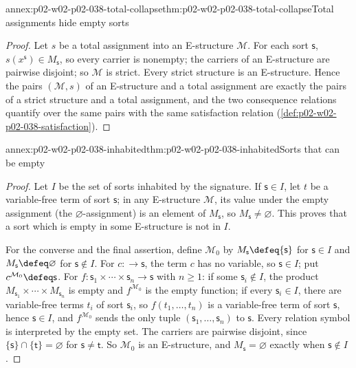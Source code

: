 \begin{annexitem}{annex:p02-w02-p02-038-total-collapse}{thm:p02-w02-p02-038-total-collapse}{Total assignments hide empty sorts}
\begin{proof}
Let \(s\) be a total assignment into an E-structure \(\mathcal M\).  For each
sort \(\mathsf s\), \(s(x^{\mathsf s})\in M_{\mathsf s}\), so every carrier is
nonempty; the carriers of an E-structure are pairwise disjoint; so
\(\mathcal M\) is strict.  Every strict structure is an E-structure.  Hence
the pairs \((\mathcal M,s)\) of an E-structure and a total assignment are
exactly the pairs of a strict structure and a total assignment, and the two
consequence relations quantify over the same pairs with the same
satisfaction relation (\cref{def:p02-w02-p02-038-satisfaction}).
\end{proof}
\end{annexitem}

\begin{annexitem}{annex:p02-w02-p02-038-inhabited}{thm:p02-w02-p02-038-inhabited}{Sorts that can be empty}
\begin{proof}
Let \(I\) be the set of sorts inhabited by the signature.  If
\(\mathsf s\in I\), let \(t\) be a variable-free term of sort \(\mathsf s\);
in any E-structure \(\mathcal M\), its value under the empty assignment (the
\(\varnothing\)-assignment) is an element of \(M_{\mathsf s}\), so
\(M_{\mathsf s}\ne\varnothing\).  This proves that a sort which is empty in
some E-structure is not in \(I\).

For the converse and the final assertion, define \(\mathcal M_0\) by
\(M_{\mathsf s}\defeq\{\mathsf s\}\) for \(\mathsf s\in I\) and
\(M_{\mathsf s}\defeq\varnothing\) for \(\mathsf s\notin I\).  For
\(c:\longrightarrow\mathsf s\), the term \(c\) has no variable, so
\(\mathsf s\in I\); put \(c^{\mathcal M_0}\defeq\mathsf s\).  For
\(f:\mathsf s_1\times\cdots\times\mathsf s_n\longrightarrow\mathsf s\) with
\(n\geq1\): if some \(\mathsf s_i\notin I\), the product
\(M_{\mathsf s_1}\times\cdots\times M_{\mathsf s_n}\) is empty and
\(f^{\mathcal M_0}\) is the empty function; if every \(\mathsf s_i\in I\),
there are variable-free terms \(t_i\) of sort \(\mathsf s_i\), so
\(f(t_1,\ldots,t_n)\) is a variable-free term of sort \(\mathsf s\), hence
\(\mathsf s\in I\), and \(f^{\mathcal M_0}\) sends the only tuple
\((\mathsf s_1,\ldots,\mathsf s_n)\) to \(\mathsf s\).  Every relation
symbol is interpreted by the empty set.  The carriers are pairwise disjoint,
since \(\{\mathsf s\}\cap\{\mathsf t\}=\varnothing\) for
\(\mathsf s\ne\mathsf t\).  So \(\mathcal M_0\) is an E-structure, and
\(M_{\mathsf s}=\varnothing\) exactly when \(\mathsf s\notin I\).
\end{proof}
\end{annexitem}

